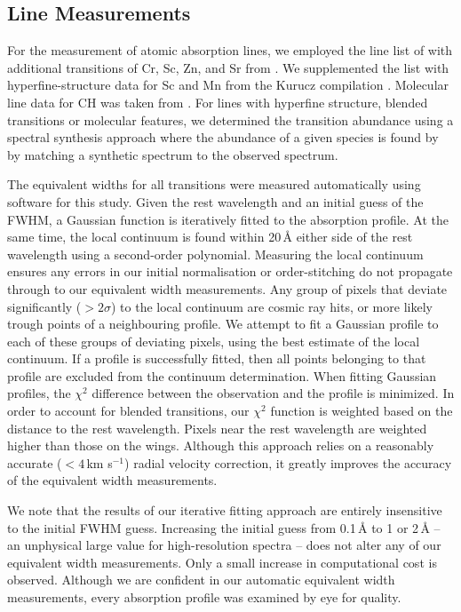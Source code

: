 \documentclass{emulateapj}
\begin{document}
\subsection{Line Measurements}
\label{sec:line-measurements}

For the measurement of atomic absorption lines, we employed the line list of \citet{yong;et-al_2005} with additional transitions of Cr, Sc, Zn, and Sr from \citet{frebel;et-al_2010}. We supplemented the list with hyperfine-structure data for Sc and Mn from the Kurucz compilation \citet{Kurucz;1998}. Molecular line data for CH was taken from \citet{Plez;et-al_2008,Plez;et-al_2009}. For lines with hyperfine structure, blended transitions or molecular features, we determined the transition abundance using a spectral synthesis approach where the abundance of a given species is found by by matching a synthetic spectrum to the observed spectrum.

The equivalent widths for all transitions were measured automatically using software for this study. Given the rest wavelength and an initial guess of the FWHM, a Gaussian function is iteratively fitted to the absorption profile. At the same time, the local continuum is found within 20\,\AA{} either side of the rest wavelength using a second-order polynomial. Measuring the local continuum ensures any errors in our initial normalisation or order-stitching do not propagate through to our equivalent width measurements. Any group of pixels that deviate significantly ($>2\sigma$) to the local continuum are cosmic ray hits, or more likely trough points of a neighbouring profile. We attempt to fit a Gaussian profile to each of these groups of deviating pixels, using the best estimate of the local continuum. If a profile is successfully fitted, then all points belonging to that profile are excluded from the continuum determination. When fitting Gaussian profiles, the $\chi^2$ difference between the observation and the profile is minimized. In order to account for blended transitions, our $\chi^2$ function is weighted based on the distance to the rest wavelength. Pixels near the rest wavelength are weighted higher than those on the wings. Although this approach relies on a reasonably accurate ($<4$\,km s$^{-1}$) radial velocity correction, it greatly improves the accuracy of the equivalent width measurements.

We note that the results of our iterative fitting approach are entirely insensitive to the initial FWHM guess. Increasing the initial guess from 0.1\,\AA{} to 1 or 2\,\AA{} -- an unphysical large value for high-resolution spectra -- does not alter any of our equivalent width measurements. Only a small increase in computational cost is observed. Although we are confident in our automatic equivalent width measurements, every absorption profile was examined by eye for quality. 
\end{document}
